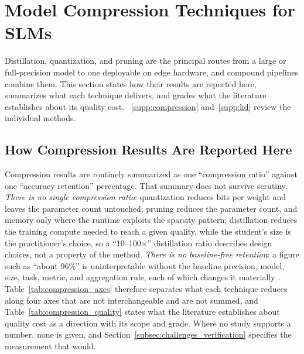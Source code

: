 
\section{Model Compression Techniques for SLMs}
\label{sec:compression}

Distillation, quantization, and pruning are the principal routes from a large or full-precision model to one deployable on edge hardware, and compound pipelines combine them. This section states how their results are reported here, summarizes what each technique delivers, and grades what the literature establishes about its quality cost. \suppsec~\ref{supp:compression} and~\ref{supp:kd} review the individual methods.

\subsection{How Compression Results Are Reported Here}
\label{subsec:compression_reporting}

Compression results are routinely summarized as one ``compression ratio'' against one ``accuracy retention'' percentage. That summary does not survive scrutiny. \emph{There is no single compression ratio}: quantization reduces bits per weight and leaves the parameter count untouched; pruning reduces the parameter count, and memory only where the runtime exploits the sparsity pattern; distillation reduces the training compute needed to reach a given quality, while the student's size is the practitioner's choice, so a ``10--100$\times$'' distillation ratio describes design choices, not a property of the method. \emph{There is no baseline-free retention}: a figure such as ``about 96\%'' is uninterpretable without the baseline precision, model, size, task, metric, and aggregation rule, each of which changes it materially \citep{lin2024awq,srivastava2025thinkslm}. Table~\ref{tab:compression_axes} therefore separates what each technique reduces along four axes that are not interchangeable and are not summed, and Table~\ref{tab:compression_quality} states what the literature establishes about quality cost as a direction with its scope and grade. Where no study supports a number, none is given, and Section~\ref{subsec:challenges_verification} specifies the measurement that would.

